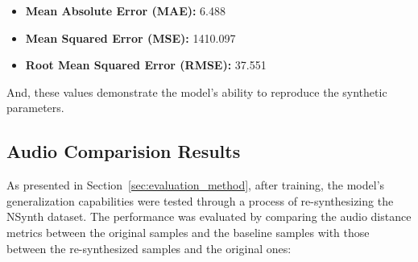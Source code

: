 \documentclass[10pt,conference]{IEEEtran}
\begin{document}
\begin{itemize}
    \item \textbf{Mean Absolute Error (MAE):} 6.488
    \item \textbf{Mean Squared Error (MSE):} 1410.097
    \item \textbf{Root Mean Squared Error (RMSE):} 37.551
\end{itemize}

And, these values demonstrate the model’s ability to reproduce the synthetic parameters.

\subsection{Audio Comparision Results}





As presented in Section~\ref{sec:evaluation_method}, after training, the model’s generalization capabilities were tested through a process of re-synthesizing the NSynth dataset. The performance was evaluated by comparing the audio distance metrics between the original samples and the baseline samples with those between the re-synthesized samples and the original ones:
\end{document}
